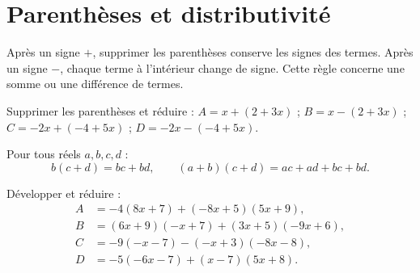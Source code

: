 \section{Parenthèses et distributivité}
\begin{method}
Après un signe $+$, supprimer les parenthèses conserve les signes des termes. Après un signe $-$, chaque terme à l'intérieur change de signe. Cette règle concerne une somme ou une différence de termes.
\end{method}
\begin{example}Supprimer les parenthèses et réduire : $A=x+(2+3x)$ ; $B=x-(2+3x)$ ; $C=-2x+(-4+5x)$ ; $D=-2x-(-4+5x)$.\end{example}
\begin{keypoint}[Distributivité]
Pour tous réels $a,b,c,d$ :
\[b(c+d)=bc+bd,\qquad(a+b)(c+d)=ac+ad+bc+bd.\]
\end{keypoint}
\begin{example}Développer et réduire :
\begin{align*}
A&=-4(8x+7)+(-8x+5)(5x+9),\\
B&=(6x+9)(-x+7)+(3x+5)(-9x+6),\\
C&=-9(-x-7)-(-x+3)(-8x-8),\\
D&=-5(-6x-7)+(x-7)(5x+8).
\end{align*}\end{example}

